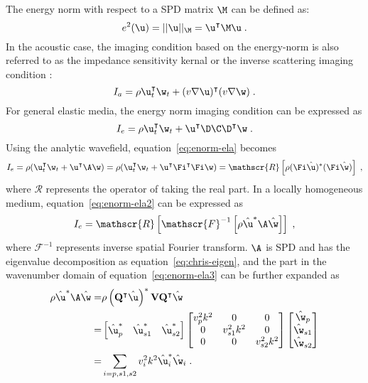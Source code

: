 The energy norm with respect to a SPD matrix $\M$ can be defined as:
\begin{equation}
    \label{eq:e-norm}
    e^2(\u) = ||\u||_{\M} = \u^\intercal \M \u \;.
\end{equation}
In the acoustic case, the imaging condition based on the energy-norm is also referred to as the impedance sensitivity kernal \cite[]{zhu09} or the inverse scattering imaging condition \cite[]{whitmore12}:
\begin{equation}
    \label{eq:enorm-acu}
    I_a = \rho \u_t^\intercal \w_t + (v \nabla \u)^\intercal (v \nabla \w) \;.
\end{equation}
For general elastic media, the energy norm imaging condition can be expressed as \cite[]{kiyashchenko07,rocha16}
\begin{equation}
    \label{eq:enorm-ela}
    I_e = \rho \u_t^\intercal \w_t + \u^\intercal \D\C\D^\intercal \w \;.
\end{equation}
Using the analytic wavefield, equation~\ref{eq:enorm-ela} becomes
\begin{equation}
    \label{eq:enorm-ela2}
    I_e = \rho ( \u_t^\intercal \w_t + \u^\intercal \A \w ) = \rho ( \u_t^\intercal \w_t + \u^\intercal \Fi^\intercal \Fi \w ) = \mathscr{R}\left[ \rho (\Fi \hat{\u})^*(\Fi \hat{\w}) \right] \;,
\end{equation}
where $\mathscr{R}$ represents the operator of taking the real part. In a locally homogeneous medium, equation~\ref{eq:enorm-ela2} can be expressed as
\begin{equation}
    \label{eq:enorm-ela3}
    I_e = \mathscr{R}\left[ \mathscr{F}^{-1} \left[ \rho \hat{\u}^* \A \hat{\w} \right] \right] \;,
\end{equation}
where $\mathscr{F}^{-1}$ represents inverse spatial Fourier transform. $\A$ is SPD and has the eigenvalue decomposition as equation~\ref{eq:chris-eigen}, and the part in the wavenumber domain of equation~\ref{eq:enorm-ela3} can be further expanded as
\begin{align}
    \label{eq:decom-ic}
    \nonumber
    \rho \hat{\u}^* \A \hat{\w} =& \rho  \left( \mathbf{Q}^\intercal \hat{\u} \right)^* \mathbf{V} \mathbf{Q}^\intercal \hat{\w} \\ \nonumber
                                =& \begin{bmatrix} \hat{\u}_p^* & \hat{\u}_{s1}^* & \hat{\u}_{s2}^*\end{bmatrix} \begin{bmatrix} v_p^2 k^2 & 0 & 0 \\ 0 & v_{s1}^2 k^2 & 0 \\ 0 & 0 & v_{s2}^2 k^2 \end{bmatrix} \begin{bmatrix} \hat{\w}_p \\ \hat{\w}_{s1} \\ \hat{\w}_{s2} \end{bmatrix} \\
                                =& \sum\limits_{i=p,s1,s2} v_i^2 k^2 \hat{\u}_i^* \hat{\w}_i \;.
\end{align}
